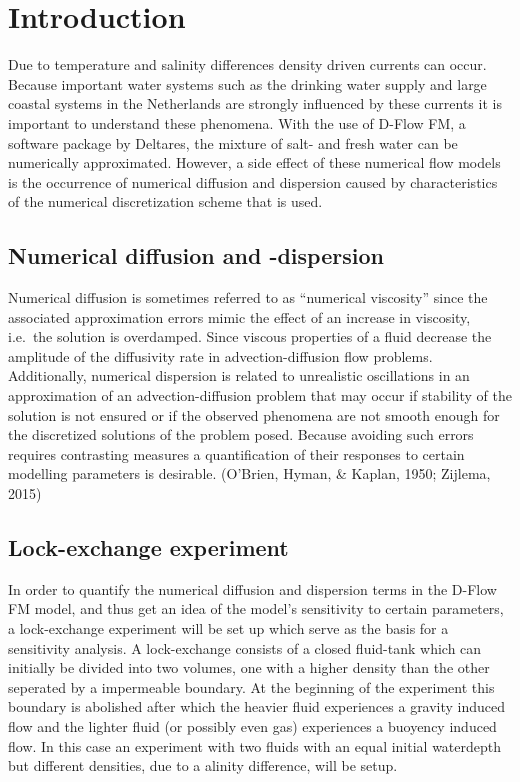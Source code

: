 \chapter{Introduction}\label{introduction}
Due to temperature and salinity differences density driven currents can
occur. Because important water systems such as the drinking water supply
and large coastal systems in the Netherlands are strongly influenced by
these currents it is important to understand these phenomena. With the
use of D-Flow FM, a software package by Deltares, the mixture of salt-
and fresh water can be numerically approximated. However, a side effect
of these numerical flow models is the occurrence of numerical diffusion
and dispersion caused by characteristics of the numerical discretization
scheme that is used.

\section{Numerical diffusion and
-dispersion}\label{numerical-diffusion-and--dispersion}

Numerical diffusion is sometimes referred to as ``numerical viscosity''
since the associated approximation errors mimic the effect of an
increase in viscosity, i.e.~the solution is overdamped. Since viscous
properties of a fluid decrease the amplitude of the diffusivity rate in
advection-diffusion flow problems. Additionally, numerical dispersion is
related to unrealistic oscillations in an approximation of an
advection-diffusion problem that may occur if stability of the solution
is not ensured or if the observed phenomena are not smooth enough for
the discretized solutions of the problem posed. Because avoiding such
errors requires contrasting measures a quantification of their responses
to certain modelling parameters is desirable. (O'Brien, Hyman, \&
Kaplan, 1950; Zijlema, 2015)

\section{Lock-exchange experiment}\label{lock-exchange-experiment}

In order to quantify the numerical diffusion and dispersion terms in the
D-Flow FM model, and thus get an idea of the model's sensitivity to
certain parameters, a lock-exchange experiment will be set up which
serve as the basis for a sensitivity analysis. A lock-exchange consists
of a closed fluid-tank which can initially be divided into two volumes,
one with a higher density than the other seperated by a impermeable
boundary. At the beginning of the experiment this boundary is abolished
after which the heavier fluid experiences a gravity induced flow and the
lighter fluid (or possibly even gas) experiences a buoyency induced
flow. In this case an experiment with two fluids with an equal initial
waterdepth but different densities, due to a alinity difference, will be
setup.

